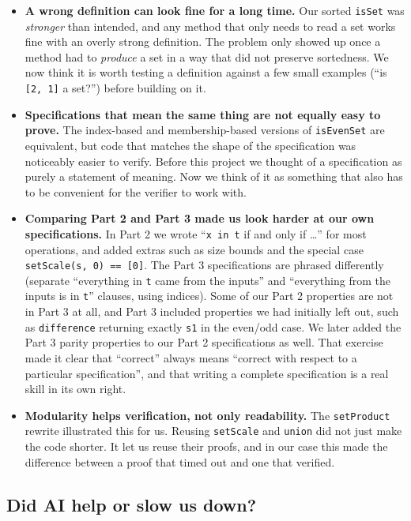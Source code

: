 \documentclass[11pt,a4paper]{article}
\begin{document}
\begin{itemize}
  \item \textbf{A wrong definition can look fine for a long time.} Our sorted \texttt{isSet} was \emph{stronger} than intended, and any method that only needs to read a set works fine with an overly strong definition. The problem only showed up once a method had to \emph{produce} a set in a way that did not preserve sortedness. We now think it is worth testing a definition against a few small examples (``is \texttt{[2, 1]} a set?'') before building on it.
  \item \textbf{Specifications that mean the same thing are not equally easy to prove.} The index-based and membership-based versions of \texttt{isEvenSet} are equivalent, but code that matches the shape of the specification was noticeably easier to verify. Before this project we thought of a specification as purely a statement of meaning. Now we think of it as something that also has to be convenient for the verifier to work with.
  \item \textbf{Comparing Part 2 and Part 3 made us look harder at our own specifications.} In Part 2 we wrote ``\texttt{x in t} if and only if \ldots'' for most operations, and added extras such as size bounds and the special case \texttt{setScale(s, 0) == [0]}. The Part 3 specifications are phrased differently (separate ``everything in \texttt{t} came from the inputs'' and ``everything from the inputs is in \texttt{t}'' clauses, using indices). Some of our Part 2 properties are not in Part 3 at all, and Part 3 included properties we had initially left out, such as \texttt{difference} returning exactly \texttt{s1} in the even/odd case. We later added the Part 3 parity properties to our Part 2 specifications as well. That exercise made it clear that ``correct'' always means ``correct with respect to a particular specification'', and that writing a complete specification is a real skill in its own right.
  \item \textbf{Modularity helps verification, not only readability.} The \texttt{setProduct} rewrite illustrated this for us. Reusing \texttt{setScale} and \texttt{union} did not just make the code shorter. It let us reuse their proofs, and in our case this made the difference between a proof that timed out and one that verified.
\end{itemize}

\subsection{Did AI help or slow us down?}
\end{document}

